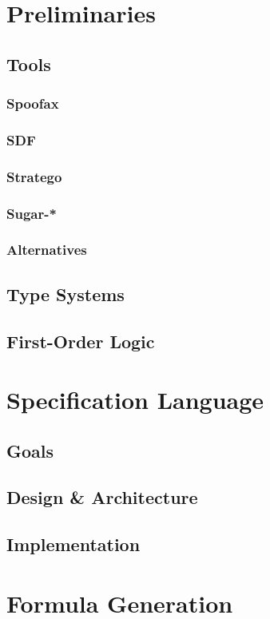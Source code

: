 \documentclass[a4paper,twoside]{report}
\begin{document}
\chapter{Preliminaries}
\section{Tools}
\subsection{Spoofax}
\subsection{SDF}
\subsection{Stratego}
\subsection{Sugar-*}
\subsection{Alternatives}
\section{Type Systems}
\section{First-Order Logic}


\chapter{Specification Language}
\section{Goals}
\section{Design \& Architecture}
\section{Implementation}

\chapter{Formula Generation}
\end{document}
